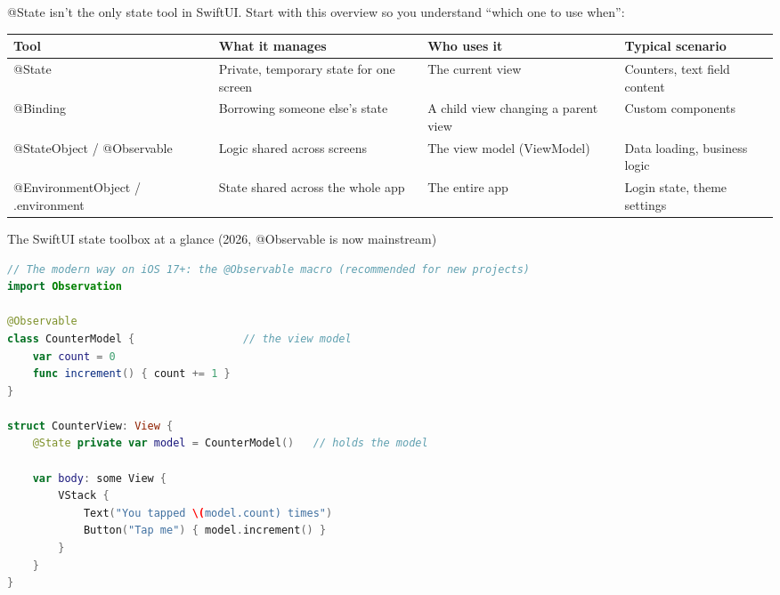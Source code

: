 


@State isn't the only state tool in SwiftUI. Start with this overview so you understand “which one to use when”:

\begin{center}
\begin{tabularx}{\linewidth}{|X|X|X|X|}
\hline
\textbf{Tool} & \textbf{What it manages} & \textbf{Who uses it} & \textbf{Typical scenario} \tabularnewline
\hline
@State & Private, temporary state for one screen & The current view & Counters, text field content \tabularnewline
@Binding & Borrowing someone else's state & A child view changing a parent view & Custom components \tabularnewline
@StateObject / @Observable & Logic shared across screens & The view model (ViewModel) & Data loading, business logic \tabularnewline
@EnvironmentObject / .environment & State shared across the whole app & The entire app & Login state, theme settings \tabularnewline
\hline
\end{tabularx}
\end{center}

\begin{center}\small\color{gray}The SwiftUI state toolbox at a glance (2026, @Observable is now mainstream)\end{center}

\begin{lstlisting}[language=Swift]
// The modern way on iOS 17+: the @Observable macro (recommended for new projects)
import Observation

@Observable
class CounterModel {                 // the view model
    var count = 0
    func increment() { count += 1 }
}

struct CounterView: View {
    @State private var model = CounterModel()   // holds the model

    var body: some View {
        VStack {
            Text("You tapped \(model.count) times")
            Button("Tap me") { model.increment() }
        }
    }
}
\end{lstlisting}

